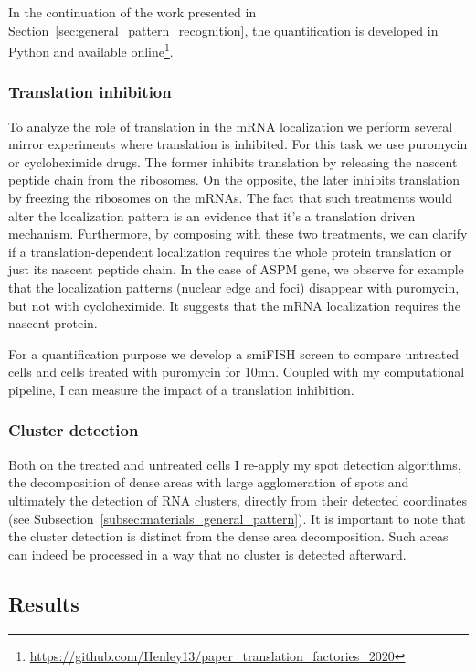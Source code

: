 In the continuation of the work presented in Section~\ref{sec:general_pattern_recognition}, the quantification is developed in Python and available online\footnote{\url{https://github.com/Henley13/paper_translation_factories_2020}}.

\subsubsection{Translation inhibition}

To analyze the role of translation in the \ac{mRNA} localization we perform several mirror experiments where translation is inhibited.
For this task we use puromycin or cycloheximide drugs.
The former inhibits translation by releasing the nascent peptide chain from the ribosomes.
On the opposite, the later inhibits translation by freezing the ribosomes on the \ac{mRNA}s.
The fact that such treatments would alter the localization pattern is an evidence that it's a translation driven mechanism.
Furthermore, by composing with these two treatments, we can clarify if a translation-dependent localization requires the whole protein translation or just its nascent peptide chain.
In the case of ASPM gene, we observe for example that the localization patterns (nuclear edge and foci) disappear with puromycin, but not with cycloheximide.
It suggests that the \ac{mRNA} localization requires the nascent protein.

For a quantification purpose we develop a \ac{smiFISH} screen to compare untreated cells and cells treated with puromycin for 10mn.
Coupled with my computational pipeline, I can measure the impact of a translation inhibition.

\subsubsection{Cluster detection}

Both on the treated and untreated cells I re-apply my spot detection algorithms, the decomposition of dense areas with large agglomeration of spots and ultimately the detection of \ac{RNA} clusters, directly from their detected coordinates (see Subsection~\ref{subsec:materials_general_pattern}).
It is important to note that the cluster detection is distinct from the dense area decomposition.
Such areas can indeed be processed in a way that no cluster is detected afterward.

\subsection{Results}
\label{subsec:results_translation_factories}

